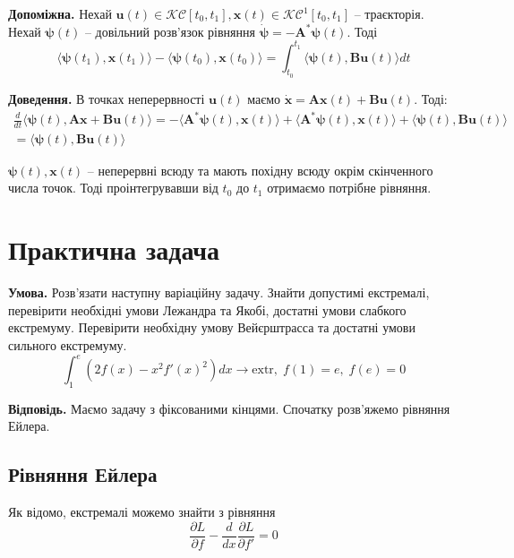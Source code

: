 \documentclass[14pt]{extarticle}
\newcommand{\<}{\langle}
\renewcommand{\>}{\rangle}
\theoremstyle{mystyle}{\newtheorem{definition}{Definition}[section]}
\theoremstyle{mystyle}{\newtheorem{proposition}[definition]{Proposition}}
\theoremstyle{mystyle}{\newtheorem{theorem}[definition]{Theorem}}
\theoremstyle{mystyle}{\newtheorem{lemma}[definition]{Lemma}}
\theoremstyle{mystyle}{\newtheorem{corollary}[definition]{Corollary}}
\theoremstyle{mystyle}{\newtheorem*{remark}{Remark}}
\theoremstyle{mystyle}{\newtheorem*{remarks}{Remarks}}
\theoremstyle{mystyle}{\newtheorem*{example}{Example}}
\theoremstyle{mystyle}{\newtheorem*{examples}{Examples}}
\theoremstyle{definition}{\newtheorem*{exercise}{Exercise}}
\theoremstyle{cstyle}{\newtheorem*{cthm}{}}
\theoremstyle{warn}
\begin{document}
\begin{lemma}
    \textbf{Допоміжна.} Нехай $\mathbf{u}(t) \in \mathcal{KC}[t_0,t_1],\mathbf{x}(t) \in \mathcal{KC}^1[t_0,t_1]$ -- траєкторія. Нехай $\boldsymbol{\psi}(t)$ -- довільний розв'язок рівняння $\dot{\boldsymbol{\psi}}=-\boldsymbol{A}^{*}\boldsymbol{\psi}(t)$. Тоді
    \begin{equation}
        \langle \boldsymbol{\psi}(t_1),\mathbf{x}(t_1) \rangle - \langle \boldsymbol{\psi}(t_0),\mathbf{x}(t_0) \rangle = \int_{t_0}^{t_1} \langle \boldsymbol{\psi}(t), \boldsymbol{B}\mathbf{u}(t) \rangle dt
    \end{equation}
\end{lemma}

\textbf{Доведення.} В точках неперервності $\mathbf{u}(t)$ маємо $\dot{\mathbf{x}} = \boldsymbol{A}\mathbf{x}(t)+\boldsymbol{B}\mathbf{u}(t)$. Тоді:
\begin{align}
    \frac{d}{dt} \langle \boldsymbol{\psi}(t), \boldsymbol{A}\mathbf{x}+\boldsymbol{B}\mathbf{u}(t) \rangle = -\langle \boldsymbol{A}^*\boldsymbol{\psi}(t),\mathbf{x}(t) \rangle + \langle \boldsymbol{A}^*\boldsymbol{\psi}(t),\mathbf{x}(t) \rangle + \langle \boldsymbol{\psi}(t), \boldsymbol{B}\mathbf{u}(t) \rangle \\= \langle \boldsymbol{\psi}(t), \boldsymbol{B}\mathbf{u}(t) \rangle
\end{align}

$\boldsymbol{\psi}(t),\mathbf{x}(t)$ -- неперервні всюду та мають похідну всюду окрім скінченного числа точок. Тоді проінтегрувавши від $t_0$ до $t_1$ отримаємо потрібне рівняння.

\pagebreak

\section{Практична задача}

\textbf{Умова.} Розв'язати наступну варіаційну задачу. Знайти допустимі екстремалі, перевірити необхідні умови Лежандра та Якобі, достатні умови слабкого екстремуму. Перевірити необхідну умову Вейєрштрасса та достатні умови сильного екстремуму.
\begin{equation}
    \int_1^e (2f(x) - x^2f'(x)^2)dx \to \text{extr}, \; f(1) = e, \; f(e) = 0
\end{equation}

\textbf{Відповідь.} Маємо задачу з фіксованими кінцями. Спочатку розв'яжемо рівняння Ейлера.

\subsection{Рівняння Ейлера}
Як відомо, екстремалі можемо знайти з рівняння
\begin{equation}
    \frac{\partial L}{\partial f} - \frac{d}{dx}\frac{\partial L}{\partial f'} = 0
\end{equation}
\end{document}
